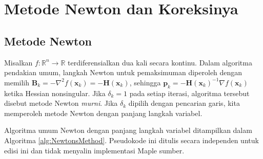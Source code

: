 \chapter{Metode Newton dan Koreksinya}\label{ch:NewtonsMethod}

\section{Metode Newton}
\begin{remark} Misalkan $f:\mathbb{R}^n\rightarrow\mathbb{R}$ terdiferensialkan dua kali secara kontinu. Dalam algoritma pendakian umum, langkah Newton untuk pemaksimuman diperoleh dengan memilih
$\mathbf{B}_k=-\nabla^2f(\mathbf{x}_k)=-\mathbf{H}(\mathbf{x}_k)$,
sehingga $\mathbf{p}_k=-\mathbf{H}(\mathbf{x}_k)^{-1}\nabla f(\mathbf{x}_k)$ ketika Hessian nonsingular. Jika $\delta_k=1$ pada setiap iterasi, algoritma tersebut disebut metode Newton \textit{murni}. Jika $\delta_k$ dipilih dengan pencarian garis, kita memperoleh metode Newton dengan panjang langkah variabel.
\end{remark}

\begin{remark} Algoritma umum Newton dengan panjang langkah variabel ditampilkan dalam Algoritma \ref{alg:NewtonsMethod}. Pseudokode ini ditulis secara independen untuk edisi ini dan tidak menyalin implementasi Maple sumber.
\end{remark}

